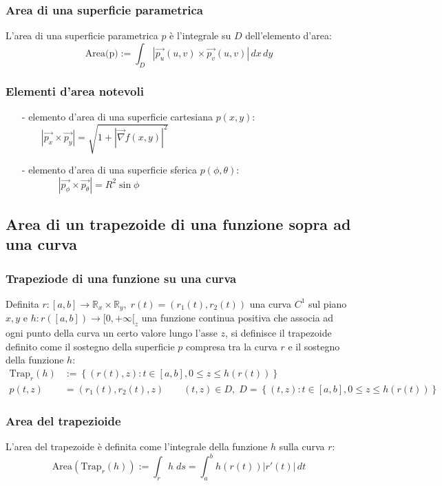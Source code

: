 \documentclass[a4paper]{article}
\newcommand\R{\mathbb{R}}     %
\newcommand\nab{\vec{\nabla}} %
\begin{document}
\subsubsection*{Area di una superficie parametrica}
L'area di una superficie parametrica \(p\) è l'integrale su \(D\) dell'elemento d'area:
\[\text{Area(p)} := \int_D \left|\vec{p_u} (u,v) \times \vec{p_v} (u,v)\right| \, dx \, dy\]

\subsubsection*{Elementi d'area notevoli}
\begin{itemize}
	\item[-] elemento d'area di una superficie cartesiana \(p(x,y)\): \(\qquad \left| \vec{p_x} \times \vec{p_y} \right| = \sqrt{1 + \left| \nab f(x,y)\right|^2}\)
	\item[-] elemento d'area di una superficie sferica \(p(\phi, \theta)\): \(\qquad \quad \;\;\:\! \left| \vec{p_\phi} \times \vec{p_\theta} \right| = R^2 \sin \phi\)
\end{itemize}

\newpage

\subsection{Area di un trapezoide di una funzione sopra ad una curva}
\subsubsection*{Trapeziode di una funzione su una curva}
Definita \(r: [a,b] \to \R_x \times \R_y, \; r(t) = (r_1(t),r_2(t))\) una curva \(C^1\) sul piano \(x,y\) e \(h : r([a,b]) \to [0,+\infty[_z\)
una funzione continua positiva che associa ad ogni punto della curva un certo valore lungo l'asse \(z\), si definisce il trapezoide
definito come il sostegno della superficie \(p\) compresa tra la curva \(r\) e il sostegno della funzione \(h\):
\begin{align*}
	\text{Trap}_r(h) &:= \left\{(r(t),z) : t \in [a,b], 0 \leq z \leq h(r(t))\right\} \\
	p(t,z) &= (r_1(t), r_2(t), z) \qquad (t,z) \in D, \; D = \left\{(t,z) : t \in [a,b], 0 \leq z \leq h(r(t))\right\}
\end{align*}

\subsubsection*{Area del trapezioide}
L'area del trapezoide è definita come l'integrale della funzione \(h\) sulla curva \(r\):
\[\text{Area}(\text{Trap}_r(h)) := \int_r h \; ds = \int_a^b h(r(t)) \left|r'(t)\right| \, dt\]
\end{document}
